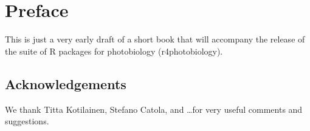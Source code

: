 \chapter{Preface}

This is just a very early draft of a short book that will accompany the release of the suite of R packages for photobiology (\textsf{r4photobiology}).

\section{Acknowledgements}

We thank Titta Kotilainen, Stefano Catola, and \ldots for very useful comments and suggestions.
